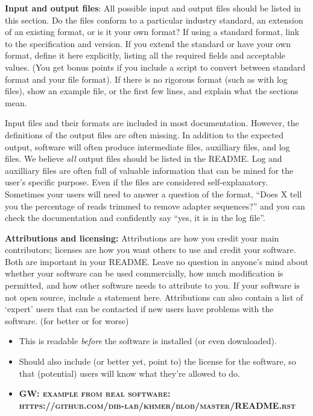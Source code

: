 \documentclass[10pt]{article}
\newcommand{\fixme}[2]{\textsc{\textbf{{#1}: {#2}}}}
\begin{document}
\textbf{Input and output files}: All possible input and output files
should be listed in this section. Do the files conform to a particular
industry standard, an extension of an existing format, or is it your own
format? If using a standard format, link to the specification and
version. If you extend the standard or have your own format, define it
here explicitly, listing all the required fields and acceptable values.
(You get bonus points if you include a script to convert between
standard format and your file format). If there is no rigorous format
(such as with log files), show an example file, or the first few lines,
and explain what the sections mean.

Input files and their formats are included in most documentation.
However, the definitions of the output files are often missing. In
addition to the expected output, software will often produce
intermediate files, auxilliary files, and log files. We believe
\emph{all} output files should be listed in the README. Log and
auxilliary files are often full of valuable information that can be
mined for the user's specific purpose. Even if the files are considered
self-explanatory. Sometimes your users will need to answer a question of
the format, ``Does X tell you the percentage of reads trimmed to remove
adapter sequences?'' and you can check the documentation and confidently
say ``yes, it is in the log file''.

\textbf{Attributions and licensing:} Attributions are how you credit
your main contributors; licenses are how you want others to use and
credit your software. Both are important in your README. Leave no
question in anyone's mind about whether your software can be used
commercially, how much modification is permitted, and how other software
needs to attribute to you. If your software is not open source, include
a statement here. Attributions can also contain a list of `expert' users
that can be contacted if new users have problems with the software. (for
better or for worse)

\begin{itemize}
\item
  This is readable \emph{before} the software is installed (or even
  downloaded).
\item
  Should also include (or better yet, point to) the license for the
  software, so that (potential) users will know what they're allowed to
  do.
\item
  \fixme{GW}{example from real software:\\ https://github.com/dib-lab/khmer/blob/master/README.rst}
\end{itemize}
\end{document}

